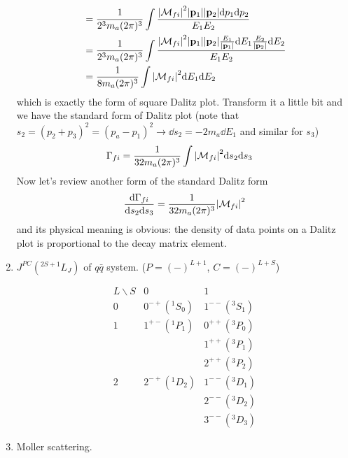 \documentclass{article}
\begin{document}
\begin{enumerate}[\bf1.]
\begin{align*}
    &=\frac{1}{2^3m_a(2\pi)^3}\int\frac{\abs{\mathcal{M}_{fi}}^2\abs{\vb{p}_1}\abs{\vb{p}_2}\dd p_1\dd p_2}{E_1E_2}\\
    &=\frac{1}{2^3m_a(2\pi)^3}\int\frac{\abs{\mathcal{M}_{fi}}^2\abs{\vb{p}_1}\abs{\vb{p}_2}\frac{E_1}{\abs{\vb{p}_1}}\dd E_1\frac{E_2}{\abs{\vb{p}_2}}\dd E_2}{E_1E_2}\\
    &=\frac{1}{8m_a(2\pi)^3}\int\abs{\mathcal{M}_{fi}}^2\dd E_1\dd E_2
  \end{align*}
  which is exactly the form of square Dalitz plot. Transform it a little bit and we have the standard form of Dalitz plot (note that $s_2=(p_2+p_3)^2=(p_a-p_1)^2\rightarrow\dd s_2=-2m_a\dd E_1$ and similar for $s_3$)
  \begin{align*}
    \Gamma_{fi}&=\frac{1}{32m_a(2\pi)^3}\int\abs{\mathcal{M}_{fi}}^2\dd s_2\dd s_3
  \end{align*}
  Now let's review another form of the standard Dalitz form
  \begin{align*}
    \frac{\dd\Gamma_{fi}}{\dd s_2\dd s_3}=\frac{1}{32m_a(2\pi)^3}\abs{\mathcal{M}_{fi}}^2
  \end{align*}
  and its physical meaning is obvious: the density of data points on a Dalitz plot is proportional to the decay matrix element.
  \item $J^{PC}(^{2S+1}L_J)$ of $q\bar q$ system. ($P=(-)^{L+1}$, $C=(-)^{L+S}$)

  $$\begin{array}{cccc}
    L\backslash S&0&1\\
    0&0^{-+}(^1S_0)&1^{--}(^3S_1)\\
    1&1^{+-}(^1P_1)&0^{++}(^3P_0)\\&&1^{++}(^3P_1)\\&&{2^{++}}(^3P_2)\\
    2&2^{-+}(^1D_2)&1^{--}(^3D_1)\\&&2^{--}(^3D_2)\\&&3^{--}(^3D_3)
  \end{array}$$
  \item Moller scattering.


\end{enumerate}
\end{document}
